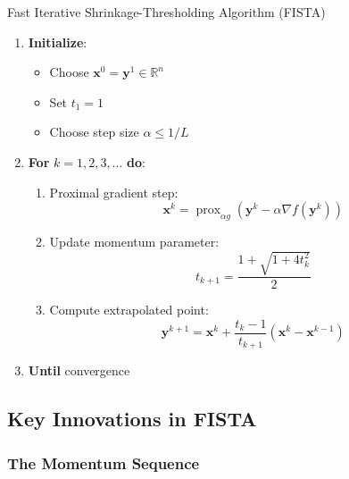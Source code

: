 \documentclass[12pt]{article}
\renewcommand{\vec}[1]{\mathbf{#1}}
\DeclareMathOperator{\prox}{prox}
\newcommand{\R}{\mathbb{R}}
\begin{document}
\begin{algorithm}
    \caption{Fast Iterative Shrinkage-Thresholding Algorithm (FISTA)}
    \begin{enumerate}
        \item \textbf{Initialize}:
              \begin{itemize}
                  \item Choose $\vec{x}^0 = \vec{y}^1 \in \R^n$
                  \item Set $t_1 = 1$
                  \item Choose step size $\alpha \leq 1/L$
              \end{itemize}
        \item \textbf{For} $k = 1, 2, 3, \ldots$ \textbf{do}:
              \begin{enumerate}[label=(\alph*)]
                  \item Proximal gradient step:
                        \begin{equation}
                            \vec{x}^k = \prox_{\alpha g}(\vec{y}^k - \alpha \nabla f(\vec{y}^k))
                        \end{equation}

                  \item Update momentum parameter:
                        \begin{equation}
                            t_{k+1} = \frac{1 + \sqrt{1 + 4t_k^2}}{2}
                        \end{equation}

                  \item Compute extrapolated point:
                        \begin{equation}
                            \vec{y}^{k+1} = \vec{x}^k + \frac{t_k - 1}{t_{k+1}}(\vec{x}^k - \vec{x}^{k-1})
                        \end{equation}
              \end{enumerate}
        \item \textbf{Until} convergence
    \end{enumerate}
\end{algorithm}

\subsection{Key Innovations in FISTA}

\subsubsection{The Momentum Sequence}
\end{document}
